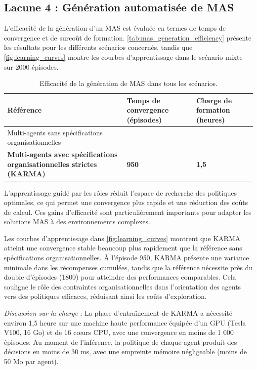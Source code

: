 \subsection{Lacune 4 : Génération automatisée de MAS}

L'efficacité de la génération d'un MAS est évaluée en termes de temps de convergence et de surcoût de formation. \autoref{tab:mas_generation_efficiency} présente les résultats pour les différents scénarios concernés, tandis que \autoref{fig:learning_curves} montre les courbes d'apprentissage dans le scénario mixte sur 2000 épisodes.

\begin{table}[h]
    \centering
    \caption{Efficacité de la génération de MAS dans tous les scénarios.}
    \label{tab:mas_generation_efficiency}{
        \footnotesize
    \begin{tabular}{>{\raggedright\arraybackslash}m{3.5cm}>{\centering\arraybackslash}m{2cm}>{\centering\arraybackslash}m{2cm}}
        \hline
        \textbf{Référence} & \textbf{Temps de convergence (épisodes)} & \textbf{Charge de formation (heures)} \\
        \hline
        Multi-agents sans spécifications organisationnelles & 1800 & 4 \\
        \textbf{Multi-agents avec spécifications organisationnelles strictes (KARMA)} & \textbf{950} & \textbf{1,5} \\
        \hline
    \end{tabular}}
\end{table}

L'apprentissage guidé par les rôles réduit l'espace de recherche des politiques optimales, ce qui permet une convergence plus rapide et une réduction des coûts de calcul. Ces gains d'efficacité sont particulièrement importants pour adapter les solutions MAS à des environnements complexes.

Les courbes d'apprentissage dans \autoref{fig:learning_curves} montrent que KARMA atteint une convergence stable beaucoup plus rapidement que la référence sans spécifications organisationnelles. À l'épisode 950, KARMA présente une variance minimale dans les récompenses cumulées, tandis que la référence nécessite près du double d'épisodes (1800) pour atteindre des performances comparables. Cela souligne le rôle des contraintes organisationnelles dans l'orientation des agents vers des politiques efficaces, réduisant ainsi les coûts d'exploration.

\noindent \textit{Discussion sur la charge :} La phase d'entraînement de KARMA a nécessité environ 1,5 heure sur une machine haute performance équipée d'un GPU (Tesla V100, 16 Go) et de 16 cœurs CPU, avec une convergence en moins de 1 000 épisodes. Au moment de l'inférence, la politique de chaque agent produit des décisions en moins de 30 ms, avec une empreinte mémoire négligeable (moins de 50 Mo par agent).

